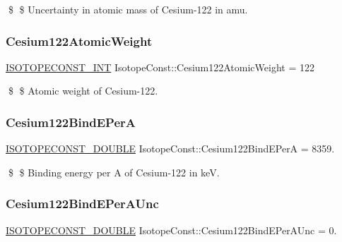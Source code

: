 \$ \$ Uncertainty in atomic mass of Cesium-\/122 in amu. \mbox{\label{group___isotope_const-_cesium-_cs122_ga1985cb91396288ec78f41336359f64e4}} 
\subsubsection{\texorpdfstring{Cesium122\+Atomic\+Weight}{Cesium122AtomicWeight}}
{\footnotesize\ttfamily \mbox{\hyperlink{group___isotope_const-_macros_ga5f18360b3e99483a35c32d789e62621c}{I\+S\+O\+T\+O\+P\+E\+C\+O\+N\+S\+T\+\_\+\+I\+NT}} Isotope\+Const\+::\+Cesium122\+Atomic\+Weight = 122}

\$ \$ Atomic weight of Cesium-\/122. \mbox{\label{group___isotope_const-_cesium-_cs122_ga313cf3d267c8a4718ea08562ef8a934c}} 
\subsubsection{\texorpdfstring{Cesium122\+Bind\+E\+PerA}{Cesium122BindEPerA}}
{\footnotesize\ttfamily \mbox{\hyperlink{group___isotope_const-_macros_ga8f45a7272ce02c0b4c65c44636ed719a}{I\+S\+O\+T\+O\+P\+E\+C\+O\+N\+S\+T\+\_\+\+D\+O\+U\+B\+LE}} Isotope\+Const\+::\+Cesium122\+Bind\+E\+PerA = 8359.}

\$ \$ Binding energy per A of Cesium-\/122 in keV. \mbox{\label{group___isotope_const-_cesium-_cs122_ga8bec292655c6b8372cbe5ba27a6c21cc}} 
\subsubsection{\texorpdfstring{Cesium122\+Bind\+E\+Per\+A\+Unc}{Cesium122BindEPerAUnc}}
{\footnotesize\ttfamily \mbox{\hyperlink{group___isotope_const-_macros_ga8f45a7272ce02c0b4c65c44636ed719a}{I\+S\+O\+T\+O\+P\+E\+C\+O\+N\+S\+T\+\_\+\+D\+O\+U\+B\+LE}} Isotope\+Const\+::\+Cesium122\+Bind\+E\+Per\+A\+Unc = 0.}

